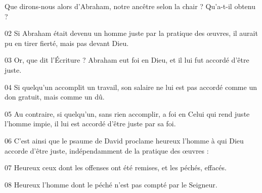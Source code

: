 Que dirons-nous alors d’Abraham, notre ancêtre selon la chair ? Qu’a-t-il obtenu ?

02 Si Abraham était devenu un homme juste par la pratique des œuvres, il aurait pu en tirer fierté, mais pas devant Dieu.

03 Or, que dit l’Écriture ? Abraham eut foi en Dieu, et il lui fut accordé d’être juste.

04 Si quelqu’un accomplit un travail, son salaire ne lui est pas accordé comme un don gratuit, mais comme un dû.

05 Au contraire, si quelqu’un, sans rien accomplir, a foi en Celui qui rend juste l’homme impie, il lui est accordé d’être juste par sa foi.

06 C’est ainsi que le psaume de David proclame heureux l’homme à qui Dieu accorde d’être juste, indépendamment de la pratique des œuvres :

07 Heureux ceux dont les offenses ont été remises, et les péchés, effacés.

08 Heureux l’homme dont le péché n’est pas compté par le Seigneur.
